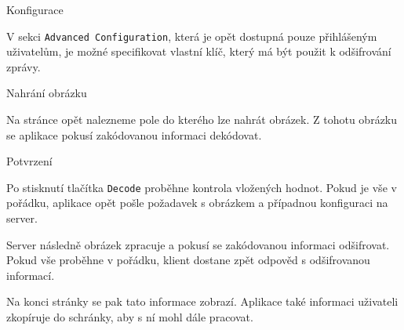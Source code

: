 \begin{subsubsection}{Konfigurace}\label{subsubsec:dec-konfigurace}

V sekci \texttt{Advanced Configuration}, která je opět dostupná pouze
přihlášeným uživatelům, je možné specifikovat vlastní klíč, který má být použit
k odšifrování zprávy.

\end{subsubsection}

\begin{subsubsection}{Nahrání obrázku}\label{subsubsec:dec-nahrani-obrazku}

Na stránce opět nalezneme pole do kterého lze nahrát obrázek.
Z tohotu obrázku se aplikace pokusí zakódovanou informaci dekódovat.

\end{subsubsection}

\begin{subsubsection}{Potvrzení}\label{subsubsec:dec-potvrzeni}

Po stisknutí tlačítka \texttt{Decode} proběhne kontrola vložených hodnot.
Pokud je vše v pořádku, aplikace opět pošle požadavek s obrázkem a
případnou konfiguraci na server.

Server následně obrázek zpracuje a pokusí se zakódovanou informaci odšifrovat.
Pokud vše proběhne v pořádku, klient dostane zpět odpověd s odšifrovanou
informací.

Na konci stránky se pak tato informace zobrazí.
Aplikace také informaci uživateli zkopíruje do schránky, aby s ní mohl dále
pracovat.

\end{subsubsection}
